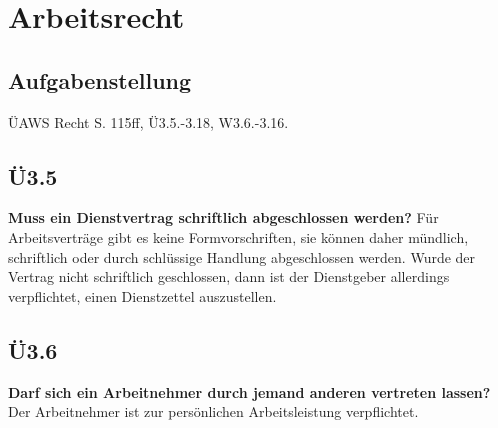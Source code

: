 
\section{Arbeitsrecht}
	\subsection{Aufgabenstellung}
		ÜAWS Recht S. 115ff, Ü3.5.-3.18, W3.6.-3.16.
	\subsection{Ü3.5}
		\textbf{Muss ein Dienstvertrag schriftlich abgeschlossen werden?}
		Für Arbeitsverträge gibt es keine Formvorschriften, sie können daher mündlich, schriftlich oder durch schlüssige Handlung abgeschlossen werden. Wurde der Vertrag nicht schriftlich geschlossen, dann ist der Dienstgeber allerdings verpflichtet, einen Dienstzettel auszustellen.
	
	\subsection{Ü3.6}
		\textbf{Darf sich ein Arbeitnehmer durch jemand anderen vertreten lassen?}
		Der Arbeitnehmer ist zur persönlichen Arbeitsleistung verpflichtet.
		
